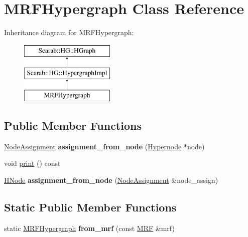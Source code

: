 \hypertarget{classMRFHypergraph}{
\section{MRFHypergraph Class Reference}
\label{classMRFHypergraph}
}
Inheritance diagram for MRFHypergraph:\begin{figure}[H]
\begin{center}
\leavevmode
\includegraphics[height=3cm]{classMRFHypergraph}
\end{center}
\end{figure}
\subsection*{Public Member Functions}
\begin{DoxyCompactItemize}
\item 
\hypertarget{classMRFHypergraph_a5c717b35842c25c6be9e827f0aa31708}{
\hyperlink{structNodeAssignment}{NodeAssignment} {\bfseries assignment\_\-from\_\-node} (\hyperlink{classScarab_1_1HG_1_1Hypernode}{Hypernode} $\ast$node)}
\label{classMRFHypergraph_a5c717b35842c25c6be9e827f0aa31708}

\item 
void \hyperlink{classMRFHypergraph_aaac6b68c3ece41ddd1f8107e961879bc}{print} () const 
\item 
\hypertarget{classMRFHypergraph_a34f14a3a9cf0d01c7fbfc11e1caa20ba}{
\hyperlink{classScarab_1_1HG_1_1Hypernode}{HNode} {\bfseries assignment\_\-from\_\-node} (\hyperlink{structNodeAssignment}{NodeAssignment} \&node\_\-assign)}
\label{classMRFHypergraph_a34f14a3a9cf0d01c7fbfc11e1caa20ba}

\end{DoxyCompactItemize}
\subsection*{Static Public Member Functions}
\begin{DoxyCompactItemize}
\item 
\hypertarget{classMRFHypergraph_af8808e644c7ff0c938f4fbd9e473dfba}{
static \hyperlink{classMRFHypergraph}{MRFHypergraph} {\bfseries from\_\-mrf} (const \hyperlink{classMRF}{MRF} \&mrf)}
\label{classMRFHypergraph_af8808e644c7ff0c938f4fbd9e473dfba}

\end{DoxyCompactItemize}


